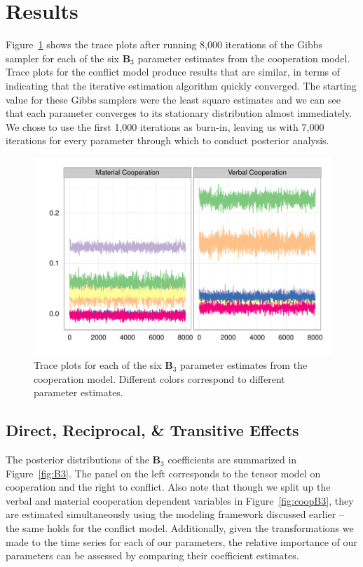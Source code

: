 \documentclass[3p,times,twocolumn,authoryear,12pt]{elsarticle}
\newcommand{\bl}[1]{{\mathbf #1}}
\begin{document}
\section{Results}

Figure~\ref{fig:trace} shows the trace plots after running 8,000 iterations of the Gibbs sampler for each of the six $\bl B_3$ parameter estimates from the cooperation model. Trace plots for the conflict model produce results that are similar, in terms of indicating that the iterative
estimation algorithm quickly converged. The starting value for these Gibbs samplers were the least square estimates and we can see that each parameter converges to its stationary distribution almost immediately. We chose to use the first 1,000 iterations as burn-in, leaving us with 7,000 iterations for every parameter through which to conduct posterior analysis.

\begin{figure}[ht]
	\centering
			\includegraphics[width=.45\textwidth]{Coop_trace}
	\caption{Trace plots for each of the six $\bl B_3$ parameter estimates from the cooperation model. Different colors correspond to different parameter estimates.}
	\label{fig:trace}
\end{figure}

\subsection{Direct, Reciprocal, \& Transitive Effects}

The posterior distributions of the $\bl B_3$ coefficients are summarized in Figure~\ref{fig:B3}. The panel on the left corresponds to the tensor model on cooperation and the right to conflict. Also note that though we split up the verbal and material cooperation dependent variables in Figure~\ref{fig:coopB3}, they are estimated simultaneously using the modeling framework discussed earlier -- the same holds for the conflict model. Additionally, given the transformations we made to the time series for each of our parameters, the relative importance of our parameters can be assessed by comparing their coefficient estimates.
\end{document}
